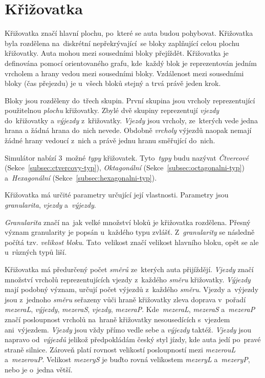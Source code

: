 \section{Křižovatka}\label{sec:krizovatka}

Křižovatka značí hlavní plochu, po~které se auta budou pohybovat.
Křižovatka byla rozdělena na~diskrétní nepřekrývající~se bloky zaplňující celou plochu křižovatky.
Auta mohou mezi sousedními bloky přejíždět.
Křižovatka je definována pomocí orientovaného grafu, kde~každý blok je reprezentován jedním vrcholem a hrany vedou mezi sousedními bloky.
Vzdálenost mezi sousedními bloky (čas přejezdu) je u~všech bloků stejný a trvá právě jeden krok.

Bloky jsou rozděleny do~třech skupin.
První skupina jsou vrcholy reprezentující použitelnou \emph{plochu} křižovatky.
Zbylé dvě skupiny reprezentují \emph{vjezdy} do~křižovatky a \emph{výjezdy} z~křižovatky.
\emph{Vjezdy} jsou vrcholy, ze~kterých vede jedna hrana a žádná hrana do~nich nevede.
Obdobně \emph{vrcholy} výjezdů naopak nemají žádné hrany vedoucí z~nich a právě jednu hranu směřující do~nich.

Simulátor nabízí $3$~možné \emph{typy} křižovatek.
Tyto~\emph{typy} budu nazývat \emph{Čtvercové} (Sekce~\ref{subsec:ctvercovy-typ}), \emph{Oktagonální} (Sekce~\ref{subsec:octagonalni-typ})
a~\emph{Hexagonální} (Sekce~\ref{subsec:hexagonalni-typ}).

Křižovatka má určité parametry určující její vlastnosti.
Parametry jsou \emph{granularita}, \emph{vjezdy} a~\emph{výjezdy}.

\emph{Granularita} značí na~jak velké množství bloků je křižovatka rozdělena.
Přesný význam granularity je popsán u~každého typu zvlášť.
Z~\emph{granularity} se následně počítá tzv. \emph{velikost bloku}.
Tato~velikost značí velikost hlavního bloku, opět se ale u~různých typů liší.

Křižovatka má předurčený počet \emph{směrů} ze~kterých auta přijíždějí.
\emph{Vjezdy} značí množství vrcholů reprezentujících vjezdy z~každého \emph{směru} křižovatky.
\emph{Výjezdy} mají podobný význam, určují počet výjezdů z~každého \emph{směru}.
Vjezdy a~výjezdy jsou z~jednoho \emph{směru} seřazeny vůči hraně křižovatky zleva doprava v~pořadí
\emph{mezeraL}, \emph{výjezdy}, \emph{mezeraS}, \emph{vjezdy}, \emph{mezeraP}.
Kde~\emph{mezeraL}, \emph{mezeraS} a~\emph{mezeraP} značí posloupnost vrcholů na~hraně křižovatky
nesousedících s~vjezdem ani~výjezdem.
\emph{Vjezdy} jsou vždy přímo vedle sebe a \emph{výjezdy} taktéž.
\emph{Vjezdy} jsou napravo od~\emph{výjezdů} jelikož předpokládám český styl jízdy, kde auta jedí po~pravé straně silnice.
Zároveň platí rovnost velikostí posloupností mezi \emph{mezerouL} a~\emph{mezerouP}.
Velikost \emph{mezeryS} je buďto rovná velikostem \emph{mezeryL} a~\emph{mezeryP}, nebo je o~jedna větší.

